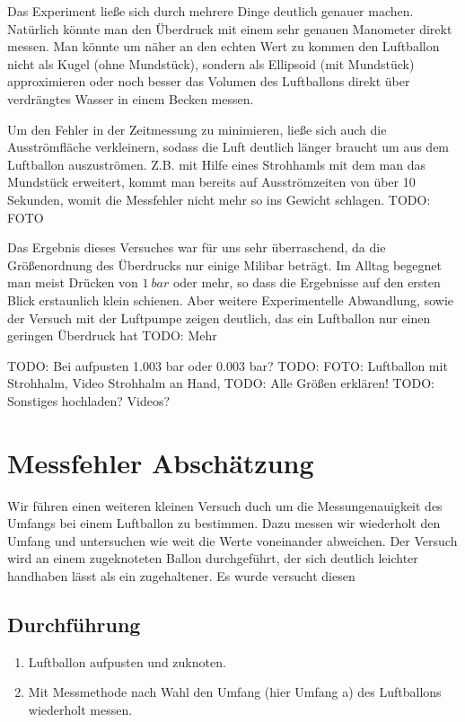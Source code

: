 \documentclass{article}
\begin{document}
        Das Experiment ließe sich durch mehrere Dinge deutlich genauer machen.
        Natürlich könnte man den Überdruck mit einem sehr genauen Manometer direkt messen.
        Man könnte um näher an den echten Wert zu kommen den Luftballon nicht als Kugel (ohne Mundstück), sondern als Ellipsoid (mit Mundstück) approximieren oder noch besser das Volumen des Luftballons direkt
        über verdrängtes Wasser in einem Becken messen.
        
        Um den Fehler in der Zeitmessung zu minimieren, ließe sich auch die Ausströmfläche verkleinern, sodass die Luft deutlich länger braucht um aus dem Luftballon auszuströmen.
        Z.B. mit Hilfe eines Strohhamls mit dem man das Mundstück erweitert, kommt man bereits auf Ausströmzeiten von über 10 Sekunden, womit die Messfehler nicht mehr so ins Gewicht schlagen. TODO: FOTO

        Das Ergebnis dieses Versuches war für uns sehr überraschend, da die Größenordnung des Überdrucks nur einige Milibar beträgt.
        Im Alltag begegnet man meist Drücken von \(\SI{1}{bar}\) oder mehr, so dass die Ergebnisse auf den ersten Blick erstaunlich klein schienen. 
        Aber weitere Experimentelle Abwandlung, sowie der Versuch mit der Luftpumpe zeigen deutlich, das ein Luftballon nur einen geringen Überdruck hat TODO: Mehr

        TODO: Bei aufpusten 1.003 bar oder 0.003 bar?
        TODO: FOTO: Luftballon mit Strohhalm, Video Strohhalm an Hand, 
        TODO: Alle Größen erklären!
        TODO: Sonstiges hochladen? Videos?

    \section{Messfehler Abschätzung}\label{Messfehler_Umfang}
        Wir führen einen weiteren kleinen Versuch duch um die Messungenauigkeit des Umfangs bei einem Luftballon zu bestimmen.
        Dazu messen wir wiederholt den Umfang und untersuchen wie weit die Werte voneinander abweichen.
        Der Versuch wird an einem zugeknoteten Ballon durchgeführt, der sich deutlich leichter handhaben lässt als ein zugehaltener.
        Es wurde versucht diesen 
        \subsection{Durchführung}
            \begin{enumerate}
                \item Luftballon aufpusten und zuknoten.
                \item Mit Messmethode nach Wahl den Umfang (hier Umfang a) des Luftballons wiederholt messen.
            \end{enumerate}
\end{document}

